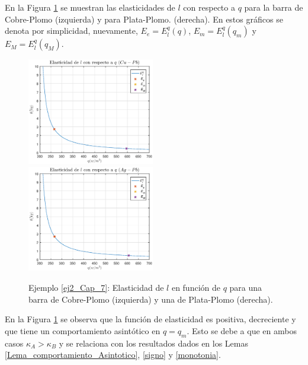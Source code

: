 %
En la Figura \ref{Elast_2} se muestran las elasticidades de $l$ con respecto a $q$ para la barra de Cobre-Plomo (izquierda) y para Plata-Plomo. (derecha). En estos gr\'aficos se 
denota por simplicidad, nuevamente,  $E_e=E_{l}^{q}(q)$, $E_m=E_{l}^{q}(q_m)$ y $E_M=E_{l}^{q}(q_M).$
%
\begin{figure}[!h]
\begin{center}
\includegraphics[width=0.495\textwidth]{7_Capitulo7/Graficos/Ejemplos/Ejemplo2/Elasticidad_Cu_Pb.eps}
\includegraphics[width=0.495\textwidth]{7_Capitulo7/Graficos/Ejemplos/Ejemplo2/Elasticidad_Ag_Pb.eps}
\vspace{-0.8cm} 
\caption{Ejemplo \ref{ej2_Cap_7}: Elasticidad de $l$ en funci\'on de $q$ para una barra de Cobre-Plomo (izquierda) y una de Plata-Plomo (derecha).}
\vspace{-0.8cm} 
\label{Elast_2}
\end{center}
\end{figure}

En la Figura \ref{Elast_2} se observa que la funci\'on de elasticidad es positiva, decreciente y que tiene un comportamiento asint\'otico en $q=q_m$. Esto se debe a que 
en ambos casos $\kappa_A>\kappa_B$ y se relaciona con los resultados dados en los Lemas \ref{Lema_comportamiento_Asintotico}, \ref{signo} y \ref{monotonia}. 

